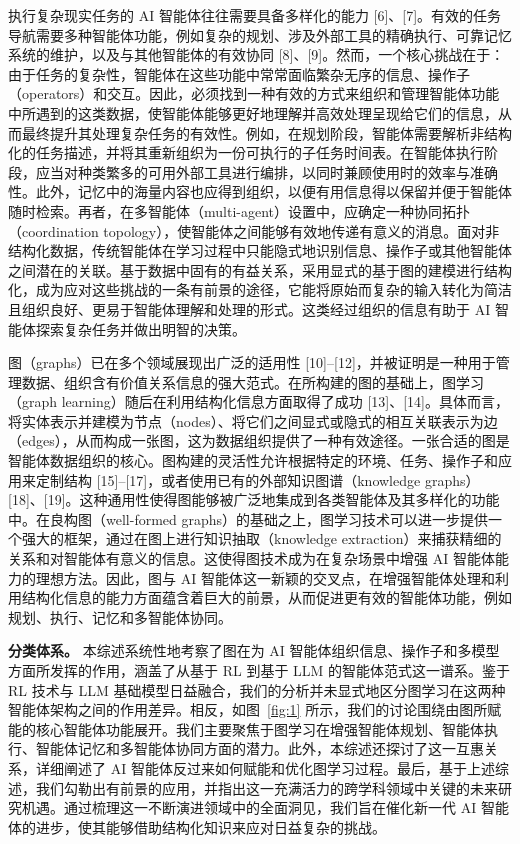 \documentclass[10pt,UTF8,fontset=fandol]{ctexart}
\begin{document}
执行复杂现实任务的 AI 智能体往往需要具备多样化的能力 [6]、[7]。有效的任务导航需要多种智能体功能，例如复杂的规划、涉及外部工具的精确执行、可靠记忆系统的维护，以及与其他智能体的有效协同 [8]、[9]。然而，一个核心挑战在于：由于任务的复杂性，智能体在这些功能中常常面临繁杂无序的信息、操作子（operators）和交互。因此，必须找到一种有效的方式来组织和管理智能体功能中所遇到的这类数据，使智能体能够更好地理解并高效处理呈现给它们的信息，从而最终提升其处理复杂任务的有效性。例如，在规划阶段，智能体需要解析非结构化的任务描述，并将其重新组织为一份可执行的子任务时间表。在智能体执行阶段，应当对种类繁多的可用外部工具进行编排，以同时兼顾使用时的效率与准确性。此外，记忆中的海量内容也应得到组织，以便有用信息得以保留并便于智能体随时检索。再者，在多智能体（multi-agent）设置中，应确定一种协同拓扑（coordination topology），使智能体之间能够有效地传递有意义的消息。面对非结构化数据，传统智能体在学习过程中只能隐式地识别信息、操作子或其他智能体之间潜在的关联。基于数据中固有的有益关系，采用显式的基于图的建模进行结构化，成为应对这些挑战的一条有前景的途径，它能将原始而复杂的输入转化为简洁且组织良好、更易于智能体理解和处理的形式。这类经过组织的信息有助于 AI 智能体探索复杂任务并做出明智的决策。

图（graphs）已在多个领域展现出广泛的适用性 [10]--[12]，并被证明是一种用于管理数据、组织含有价值关系信息的强大范式。在所构建的图的基础上，图学习（graph learning）随后在利用结构化信息方面取得了成功 [13]、[14]。具体而言，将实体表示并建模为节点（nodes）、将它们之间显式或隐式的相互关联表示为边（edges），从而构成一张图，这为数据组织提供了一种有效途径。一张合适的图是智能体数据组织的核心。图构建的灵活性允许根据特定的环境、任务、操作子和应用来定制结构 [15]--[17]，或者使用已有的外部知识图谱（knowledge graphs）[18]、[19]。这种通用性使得图能够被广泛地集成到各类智能体及其多样化的功能中。在良构图（well-formed graphs）的基础之上，图学习技术可以进一步提供一个强大的框架，通过在图上进行知识抽取（knowledge extraction）来捕获精细的关系和对智能体有意义的信息。这使得图技术成为在复杂场景中增强 AI 智能体能力的理想方法。因此，图与 AI 智能体这一新颖的交叉点，在增强智能体处理和利用结构化信息的能力方面蕴含着巨大的前景，从而促进更有效的智能体功能，例如规划、执行、记忆和多智能体协同。

\textbf{分类体系。} 本综述系统性地考察了图在为 AI 智能体组织信息、操作子和多模型方面所发挥的作用，涵盖了从基于 RL 到基于 LLM 的智能体范式这一谱系。鉴于 RL 技术与 LLM 基础模型日益融合，我们的分析并未显式地区分图学习在这两种智能体架构之间的作用差异。相反，如图~\ref{fig:1} 所示，我们的讨论围绕由图所赋能的核心智能体功能展开。我们主要聚焦于图学习在增强智能体规划、智能体执行、智能体记忆和多智能体协同方面的潜力。此外，本综述还探讨了这一互惠关系，详细阐述了 AI 智能体反过来如何赋能和优化图学习过程。最后，基于上述综述，我们勾勒出有前景的应用，并指出这一充满活力的跨学科领域中关键的未来研究机遇。通过梳理这一不断演进领域中的全面洞见，我们旨在催化新一代 AI 智能体的进步，使其能够借助结构化知识来应对日益复杂的挑战。
\end{document}
